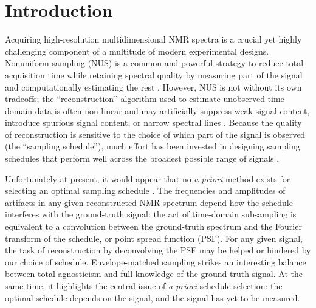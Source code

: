 \documentclass[final,5p,times,twocolumn]{elsarticle}
\begin{document}
\section{Introduction}
\label{sec:intro}
Acquiring high-resolution multidimensional NMR spectra is a crucial yet
highly challenging component of a multitude of modern experimental designs.
Nonuniform sampling (NUS) is a common and powerful strategy
\cite{kazimierczuk:jmr2009,rovnyak:mrc2011,hyberts:jbnmr2013,palmer:jbnmr2014}
to reduce total acquisition time while retaining spectral quality by
measuring part of the signal and computationally estimating the rest
\cite{bretthorst:cmr2008}.
However, NUS is not without its own tradeoffs; the ``reconstruction''
algorithm used to estimate unobserved time-domain data is often non-linear
and may artificially suppress weak signal content, introduce spurious
signal content, or narrow spectral lines \cite{maciejewski:jmr2009}.
Because the quality of reconstruction is sensitive to the choice
of which part of the signal is observed (the ``sampling schedule''), much
effort has been invested in designing sampling schedules that perform well
across the broadest possible range of signals
\cite{hyberts:jacs2010,mobli:jmr2015,worley:jmr2015,worley:jmr2016b,%
cullen:mrc2023,love:jmro2025}.

Unfortunately at present, it would appear that no \emph{a priori} method
exists for selecting an optimal sampling schedule \cite{love:jmro2025}.
The frequencies and amplitudes of artifacts in any given reconstructed NMR
spectrum depend how the schedule interferes with the ground-truth signal: the
act of time-domain subsampling is equivalent to a convolution between the
ground-truth spectrum and the Fourier transform of the schedule, or point
spread function (PSF). For any given signal, the task of reconstruction by
deconvolving the PSF may be helped or hindered by our choice of schedule.
Envelope-matched sampling \cite{schuyler:jbnmr2011} strikes an interesting
balance between total agnosticism and full knowledge of the ground-truth
signal. At the same time, it highlights the central issue of \emph{a priori}
schedule selection: the optimal schedule depends on the signal, and the
signal has yet to be measured.
\end{document}
